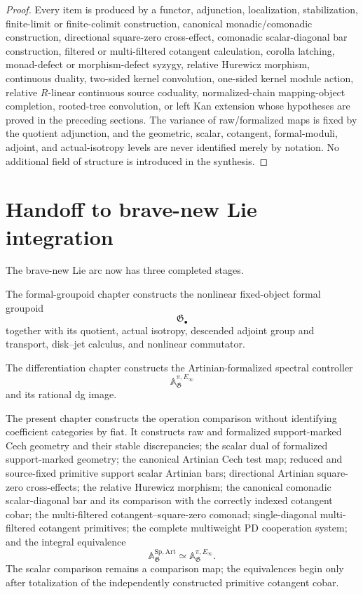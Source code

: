 \begin{proof}
Every item is produced by a functor, adjunction, localization, stabilization,
finite-limit or finite-colimit construction, canonical monadic/comonadic
construction, directional square-zero cross-effect, comonadic scalar-diagonal
bar construction, filtered or multi-filtered cotangent calculation, corolla
latching, monad-defect or morphism-defect syzygy, relative Hurewicz morphism,
continuous duality, two-sided kernel convolution, one-sided kernel module
action, relative $R$-linear continuous source coduality, normalized-chain
mapping-object completion,
rooted-tree convolution, or left Kan extension
whose hypotheses are proved in the preceding sections.  The variance of
raw/formalized maps is fixed by the quotient adjunction, and the geometric,
scalar, cotangent, formal-moduli, adjoint, and actual-isotropy levels are never
identified merely by notation.  No additional field of structure is
introduced in the synthesis.
\end{proof}

\section{Handoff to brave-new Lie integration}
\label{sec:as-handoff-integration}

The brave-new Lie arc now has three completed stages.

The formal-groupoid chapter constructs the nonlinear fixed-object formal
groupoid
\[
    \mathfrak G_\bullet
\]
together with its quotient, actual isotropy, descended adjoint group and
transport, disk--jet calculus, and nonlinear commutator.

The differentiation chapter constructs the Artinian-formalized spectral
controller
\[
    \mathbb A_{\mathfrak G}^{\pi,E_\infty}
\]
and its rational dg image.

The present chapter constructs the operation comparison without identifying
coefficient categories by fiat.  It constructs raw and formalized
support-marked Cech geometry and their stable discrepancies; the scalar dual
of formalized support-marked geometry; the canonical Artinian Cech test map;
reduced and source-fixed primitive support scalar Artinian bars; directional
Artinian square-zero cross-effects; the relative Hurewicz morphism; the
canonical comonadic scalar-diagonal bar and its comparison with the correctly
indexed cotangent cobar; the multi-filtered cotangent--square-zero comonad;
single-diagonal multi-filtered cotangent primitives; the complete multiweight
PD cooperation system; and the integral equivalence
\[
    \mathbb A_{\mathfrak G}^{\mathrm{Sp,Art}}
    \simeq
    \mathbb A_{\mathfrak G}^{\pi,E_\infty}.
\]
The scalar comparison remains a comparison map; the equivalences begin only
after totalization of the independently constructed primitive cotangent
cobar.

